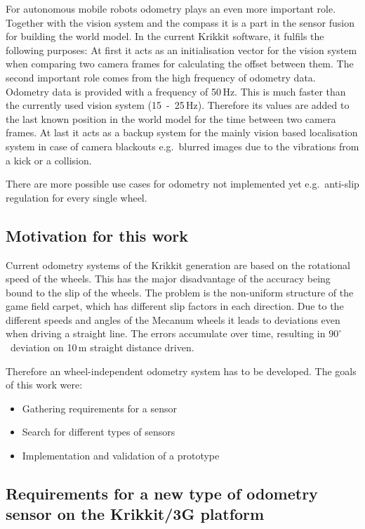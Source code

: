 \documentclass[12pt,a4paper]{article}
\begin{document}
For autonomous mobile robots odometry plays an even more important role.
Together with the vision system and the compass it is a part in the sensor fusion for building the world model.
In the current Krikkit software, it fulfils the following purposes:
At first it acts as an initialisation vector for the vision system when comparing two camera frames for calculating the offset between them.
The second important role comes from the high frequency of odometry data.
Odometry data is provided with a frequency of 50\,Hz. 
This is much faster than the currently used vision system (15~-~25\,Hz). 
Therefore its values are added to the last known position in the world model for the time between two camera frames.
At last it acts as a backup system for the mainly vision based localisation system in case of camera blackouts e.g.\ blurred images due to the vibrations from a kick or a collision.

There are more possible use cases for odometry not implemented yet e.g.\ anti-slip regulation for every single wheel.



\subsection{Motivation for this work}
\label{motivation}
  
Current odometry systems of the Krikkit generation are based on the rotational speed of the wheels.
This has the major disadvantage of the accuracy being bound to the slip of the wheels. %
The problem is the non-uniform structure of the game field carpet, which has different slip factors in each direction.
Due to the different speeds and angles of the Mecanum wheels it leads to deviations even when driving a straight line.
The errors accumulate over time, resulting in $90^\circ$~deviation on 10\,m straight distance driven.

Therefore an wheel-independent odometry system has to be developed.
The goals of this work were:
\begin{itemize}
  \item Gathering requirements for a sensor
  \item Search for different types of sensors
  \item Implementation and validation of a prototype
\end{itemize}


\subsection{Requirements for a new type of odometry sensor on the Krikkit/3G platform}
\end{document}

